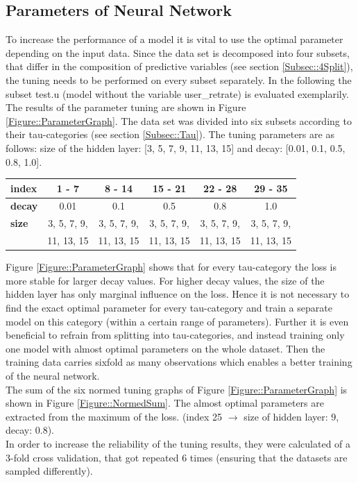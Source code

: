 \documentclass[a4paper,12pt]{article}
\begin{document}
\subsection{Parameters of Neural Network}\label{Subsec::ParsNNet}
To increase the performance of a model it is vital to use the optimal parameter depending on the input data. Since the data set is decomposed into four subsets, that differ in the composition of predictive variables (see section \ref{Subsec::4Split}), the tuning needs to be performed on every subset separately. In the following the subset test.u (model without the variable user\_retrate) is evaluated exemplarily.\\
The results of the parameter tuning are shown in Figure \ref{Figure::ParameterGraph}. The data set was divided into six subsets according to their tau-categories (see section \ref{Subsec::Tau}). The tuning parameters are as follows: size of the hidden layer: [3, 5, 7, 9, 11, 13, 15] and decay: [0.01, 0.1, 0.5, 0.8, 1.0].\\
\begin{center}
\begin{tabular}{| l || c | c | c | c | c |}
 \hline
 \textbf{index}  & 1 - 7 & 8 - 14 & 15 - 21 & 22 - 28 & 29 - 35\\
 \hline
  \textbf{decay} & 0.01   & 0.1     & 0.5     & 0.8   & 1.0 \\
  \hline
 \textbf{size}   & 3, 5, 7, 9, & 3, 5, 7, 9, & 3, 5, 7, 9, & 3, 5, 7, 9, & 3, 5, 7, 9,\\ 
                 & 11, 13, 15  & 11, 13, 15  & 11, 13, 15  & 11, 13, 15  & 11, 13, 15 \\
\hline 
\end{tabular} 
\end{center} 
\vspace{0.8cm}

Figure \ref{Figure::ParameterGraph} shows that for every tau-category the loss is more stable for larger decay values. For higher decay values, the size of the hidden layer has only marginal influence on the loss. Hence it is not necessary to find the exact optimal parameter for every tau-category and train a separate model on this category (within a certain range of parameters). Further it is even beneficial to refrain from splitting into tau-categories, and instead training only one model with almost optimal parameters on the whole dataset. Then the training data carries sixfold as many observations which enables a better training of the neural network.\\
The sum of the six normed tuning graphs of Figure \ref{Figure::ParameterGraph} is shown in Figure \ref{Figure::NormedSum}. The almost optimal parameters are extracted from the maximum of the loss. (index 25 $\rightarrow$ size of hidden layer: 9, decay: 0.8).\\
In order to increase the reliability of the tuning results, they were calculated of a 3-fold cross validation, that got repeated 6 times (ensuring that the datasets are sampled differently). 
\end{document}
